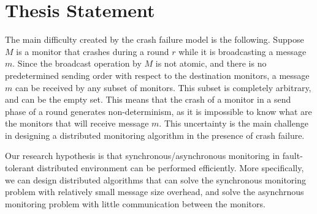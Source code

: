 % 
% 
% 
% 



\section{Thesis Statement}

The main difficulty created by the crash failure model is the following. 
Suppose $M$ is a monitor that crashes during a round $r$ while it is 
broadcasting a message $m$. Since the broadcast operation by $M$ is not atomic, 
and there is no predetermined sending order with respect to the destination 
monitors, a message $m$ can be received by any subset of monitors. This subset 
is completely arbitrary, and can be the empty set. This means that the crash of 
a monitor in a send phase of a round generates non-determinism, as it is 
impossible to know what are the monitors that will receive message $m$. This 
uncertainty is the main challenge in designing a distributed monitoring 
algorithm in the presence of crash failure.

Our research hypothesis is that synchronous/asynchronous monitoring in 
fault-tolerant distributed environment can be performed efficiently. More 
specifically, we can design distributed algorithms that can solve the 
synchronous monitoring problem with relatively small message size overhead, and 
solve the asynchrnous monitoring problem with little communication between the 
monitors.

